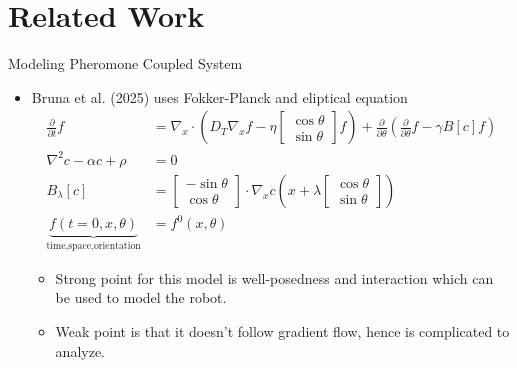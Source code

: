 \documentclass[10pt]{beamer}
\begin{document}
\section{Related Work}
\begin{frame}{Modeling Pheromone Coupled System}
    \begin{itemize}
        \item Bruna et al. (2025) uses Fokker-Planck and eliptical equation
        \begin{align*}
            \frac{\partial}{\partial t}f &= \nabla_x \cdot\left(D_T\nabla_x{f}-\eta\begin{bmatrix}\cos\theta\\ \sin\theta\end{bmatrix}f\right)+\frac{\partial}{\partial\theta}\left(\frac{\partial}{\partial\theta}f-\gamma B[c]f\right)\\
            \nabla^2c-\alpha c + \rho&=0\\
            B_\lambda[c] &= \begin{bmatrix}-\sin\theta\\ \cos\theta\end{bmatrix}\cdot\nabla_xc\left(x+\lambda \begin{bmatrix}\cos\theta\\ \sin\theta\end{bmatrix}\right)\\
            \underbrace{f(t=0,x,\theta)}_{\text{time,space,orientation}}&=f^{0}(x,\theta)
        \end{align*}
        \begin{itemize}
            \item Strong point for this model is well-posedness and interaction which can be used to model the robot.
            \item Weak point is that it doesn't follow gradient flow, hence is complicated to analyze.
        \end{itemize}
    \end{itemize}
\end{frame}
\end{document}
